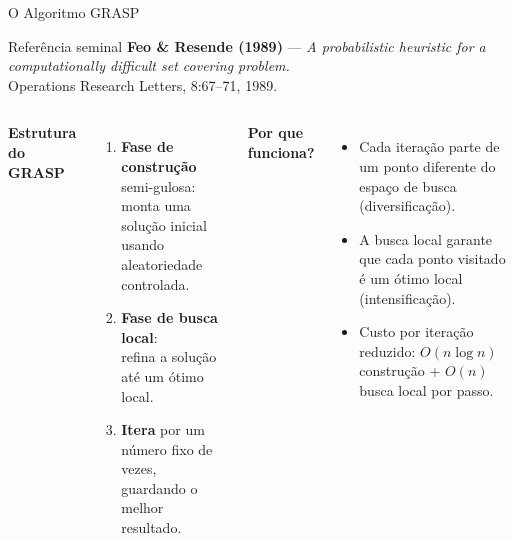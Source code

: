 \documentclass[aspectratio=169]{beamer}
\begin{document}
\begin{frame}{O Algoritmo GRASP}

  \begin{block}{Referência seminal}
    \textbf{Feo \& Resende (1989)} — \emph{A probabilistic heuristic for a
    computationally difficult set covering problem.}\\
    Operations Research Letters, 8:67–71, 1989.
  \end{block}

  \vspace{0.5em}
  \begin{columns}[T]
      \textbf{Estrutura do GRASP}
      \begin{enumerate}
        \item \textbf{Fase de construção} semi-gulosa:\\
              monta uma solução inicial usando aleatoriedade controlada.
        \item \textbf{Fase de busca local}:\\
              refina a solução até um ótimo local.
        \item \textbf{Itera} por um número fixo de vezes,\\
              guardando o melhor resultado.
      \end{enumerate}
      \textbf{Por que funciona?}
      \begin{itemize}
        \item Cada iteração parte de um ponto diferente do espaço de busca
              (diversificação).
        \item A busca local garante que cada ponto visitado é um ótimo local
              (intensificação).
        \item Custo por iteração reduzido: $O(n \log n)$ construção +
              $O(n)$ busca local por passo.
      \end{itemize}
  \end{columns}

\end{frame}
\end{document}
